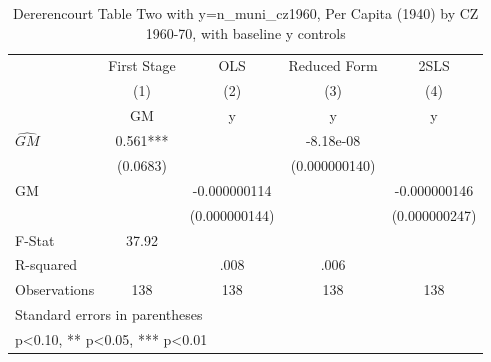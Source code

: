 \begin{table}[htbp]\centering
\def\sym#1{\ifmmode^{#1}\else\(^{#1}\)\fi}
\caption{Dererencourt Table Two with y=n\_muni\_cz1960, Per Capita (1940) by CZ 1960-70, with baseline y controls}
\begin{tabular}{l*{4}{c}}
\toprule
                    & First Stage   &         OLS   &Reduced Form   &        2SLS   \\
                    &\multicolumn{1}{c}{(1)}&\multicolumn{1}{c}{(2)}&\multicolumn{1}{c}{(3)}&\multicolumn{1}{c}{(4)}\\
                    &\multicolumn{1}{c}{GM}&\multicolumn{1}{c}{y}&\multicolumn{1}{c}{y}&\multicolumn{1}{c}{y}\\
\midrule
$\hat{GM}$          &       0.561***&               &   -8.18e-08   &               \\
                    &    (0.0683)   &               &(0.000000140)   &               \\
\addlinespace
GM                  &               &-0.000000114   &               &-0.000000146   \\
                    &               &(0.000000144)   &               &(0.000000247)   \\
\midrule
F-Stat              &       37.92   &               &               &               \\
R-squared           &               &        .008   &        .006   &               \\
Observations        &         138   &         138   &         138   &         138   \\
\bottomrule
\multicolumn{5}{l}{\footnotesize Standard errors in parentheses}\\
\multicolumn{5}{l}{\footnotesize * p<0.10, ** p<0.05, *** p<0.01}\\
\end{tabular}
\end{table}
